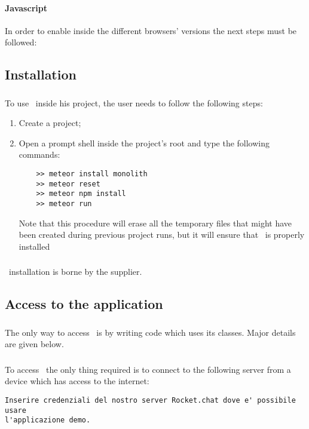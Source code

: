 \paragraph{Javascript}
In order to enable  inside the different browsers' versions the next steps must be followed:


\subsection{Installation}
\subsubsection{\progettoShort}
To use \progettoShort\ inside his project, the user needs to follow the following steps:
\begin{enumerate}
	\item Create a  project;
	\item Open a prompt shell inside the project's root and type the following commands:
	\begin{lstlisting}
	>> meteor install monolith
	>> meteor reset
	>> meteor npm install
	>> meteor run
	\end{lstlisting}
	Note that this procedure will erase all the temporary files that might have been created during previous project runs, but it will ensure that \progettoShort\ is properly installed
\end{enumerate}

\subsubsection{\app}
\app\ installation is borne by the supplier.

\subsection{Access to the application}
\subsubsection{\progettoShort}
The only way to access \progettoShort\ is by writing code which uses its classes. Major details are given below.

\subsubsection{\app}
To access \app\, the only thing required is to connect to the following  server from a device which has access to the internet:
\begin{lstlisting}
Inserire credenziali del nostro server Rocket.chat dove e' possibile usare 
l'applicazione demo.
\end{lstlisting}


\newpage
